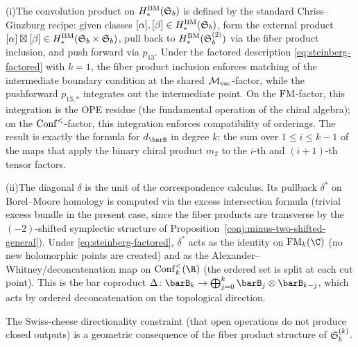 \begin{remark}[Evidence]
(i)\enspace The convolution product on $H_*^{\mathrm{BM}}(\mathfrak{S}_b)$ is
defined by the standard Chriss--Ginzburg recipe: given classes
$[\alpha], [\beta] \in H_*^{\mathrm{BM}}(\mathfrak{S}_b)$, form the external
product $[\alpha] \boxtimes [\beta] \in
H_*^{\mathrm{BM}}(\mathfrak{S}_b \times \mathfrak{S}_b)$, pull back to
$H_*^{\mathrm{BM}}(\mathfrak{S}_b^{(2)})$ via the fiber product inclusion, and
push forward via $p_{13}$. Under the factored description
\eqref{eq:steinberg-factored} with $k = 1$, the fiber product
inclusion enforces matching of the intermediate boundary condition
at the shared $\mathcal M_{\mathrm{vac}}$-factor, while the pushforward
$p_{13,*}$ integrates out the intermediate point. On the
$\operatorname{FM}$-factor, this integration is the OPE residue (the fundamental
operation of the chiral algebra); on the $\operatorname{Conf}^{<}$-factor, this
integration enforces compatibility of orderings. The result is
exactly the formula for $d_{\barB}$ in degree $k$: the sum over
$1 \le i \le k-1$ of the maps that apply the binary chiral product
$m_2$ to the $i$-th and $(i+1)$-th tensor factors.

(ii)\enspace The diagonal $\delta$ is the unit of the
correspondence calculus. Its pullback $\delta^*$ on Borel--Moore
homology is computed via the excess intersection formula (trivial
excess bundle in the present case, since the fiber products are
transverse by the $(-2)$-shifted symplectic structure of
Proposition~\ref{conj:minus-two-shifted-general}). Under
\eqref{eq:steinberg-factored}, $\delta^*$ acts as the identity on
$\FM_k(\C)$ (no new holomorphic points are created) and as the
Alexander--Whitney/deconcatenation map on $\Conf_k^{<}(\R)$ (the
ordered set is split at each cut point). This is the bar coproduct
$\Delta \colon \barB_k \to \bigoplus_{j=0}^{k} \barB_j \otimes
\barB_{k-j}$, which acts by ordered deconcatenation on the
topological direction.
\end{remark}

\begin{conjecture}
\label{conj:directionality-correspondence}
The Swiss-cheese directionality constraint (that open operations
do not produce closed outputs) is a geometric consequence of the
fiber product structure of $\mathfrak{S}_b^{(k)}$.
\end{conjecture}

